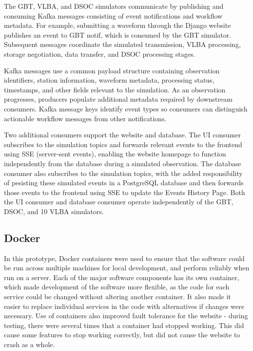 \documentclass[12pt]{article}
\begin{document}
The GBT, VLBA, and DSOC simulators communicate by publishing and consuming Kafka messages consisting of event notifications and workflow metadata. For example, submitting a waveform through the Django website publishes an event to GBT notif, which is consumed by the GBT simulator. Subsequent messages coordinate the simulated transmission, VLBA processing, storage negotiation, data transfer, and DSOC processing stages.

Kafka messages use a common payload structure containing observation identifiers, station information, waveform metadata, processing status, timestamps, and other fields relevant to the simulation. As an observation progresses, producers populate additional metadata required by downstream consumers. Kafka message keys identify event types so consumers can distinguish actionable workflow messages from other notifications.

Two additional consumers support the website and database. The UI consumer subscribes to the simulation topics and forwards relevant events to the frontend using SSE (server-sent events), enabling the website homepage to function independently from the database during a simulated observation. The database consumer also subscribes to the simulation topics, with the added responsibility of pesisting these simulated events in a PostgreSQL database and then forwards those events to the frontend using SSE to update the Events History Page. Both the UI consumer and database consumer operate independently of the GBT, DSOC, and 10 VLBA simulators.

  
\subsection*{Docker}

In this prototype, Docker containers were used to ensure that the software could be run across multiple machines for local development, and perform reliably when run on a server. Each of the major software components has its own container, which made development of the software more flexible, as the code for each service could be changed without altering another container. It also made it easier to replace individual services in the code with alternatives if changes were necessary. Use of containers also improved fault tolerance for the website - during testing, there were several times that a container had stopped working. This did cause some features to stop working correctly, but did not cause the website to crash as a whole.
\end{document}
